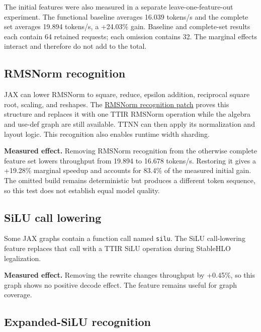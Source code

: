 \documentclass[
  10pt,
  american,
  10pt,
  letterpaper]{article}
\begin{document}
\endgroup

The initial features were also measured in a separate
leave-one-feature-out experiment. The functional baseline averages
16.039 tokens/s and the complete set averages 19.894 tokens/s, a
+24.03\% gain. Baseline and complete-set results each contain 64
retained requests; each omission contains 32. The marginal effects
interact and therefore do not add to the total.

\hypertarget{rmsnorm-recognition}{%
\subsection{RMSNorm recognition}\label{rmsnorm-recognition}}

JAX can lower RMSNorm to square, reduce, epsilon addition, reciprocal
square root, scaling, and reshapes. The
\href{../../third_party/tt_xla/tt_mlir_fuse_jax_rms_norm.patch}{RMSNorm
recognition patch} proves this structure and replaces it with one TTIR
RMSNorm operation while the algebra and use-def graph are still
available. TTNN can then apply its normalization and layout logic. This
recognition also enables runtime width sharding.

\textbf{Measured effect.} Removing RMSNorm recognition from the
otherwise complete feature set lowers throughput from 19.894 to 16.678
tokens/s. Restoring it gives a +19.28\% marginal speedup and accounts
for 83.4\% of the measured initial gain. The omitted build remains
deterministic but produces a different token sequence, so this test does
not establish equal model quality.

\hypertarget{silu-call-lowering}{%
\subsection{SiLU call lowering}\label{silu-call-lowering}}

Some JAX graphs contain a function call named \texttt{silu}. The SiLU
call-lowering feature replaces that call with a TTIR SiLU operation
during StableHLO legalization.

\textbf{Measured effect.} Removing the rewrite changes throughput by
+0.45\%, so this graph shows no positive decode effect. The feature
remains useful for graph coverage.

\hypertarget{expanded-silu-recognition}{%
\subsection{Expanded-SiLU recognition}\label{expanded-silu-recognition}}
\end{document}
